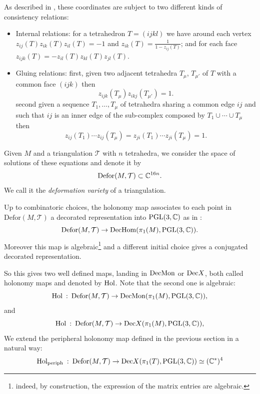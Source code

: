  As described in \cite{BFG}, these coordinates are subject to two different kinds of consistency relations: 
\begin{itemize}
 \item Internal relations: for a tetrahedron $T=(ijkl)$ we have around each vertex $z_{ij}(T)z_{ik}(T)z_{il}(T)=-1$ and $z_{ik}(T)=\frac{1}{1-z_{ij}(T)}$; and for each face $z_{ijk}(T)=-z_{il}(T)z_{kl}(T)z_{jl}(T)$.  
 \item Gluing relations: first, given two adjacent tetrahedra $T_{\mu}$, $T_{\mu'}$
of $T$ with a common face  
$(ijk)$ then 
\begin{equation} \label{face}
z_{ijk} (T_{\mu}) z_{ikj} (T_{\mu'}) = 1.
\end{equation}
second given a sequence $T_1, \ldots , T_{\mu}$ of tetrahedra sharing a
common edge $ij$ and such that $ij$ is an inner edge of the sub-complex composed by $T_1\cup \cdots \cup T_{\mu}$ 
then 
\begin{equation} \label{edge}
z_{ij} (T_1) \cdots z_{ij} (T_{\mu}) = z_{ji} (T_1) \cdots z_{ji} (T_{\mu}) = 1.
\end{equation}
 \end{itemize}
 
Given $M$ and a triangulation $\mathcal{T}$ with $n$ tetrahedra, we consider the space of solutions of these equations and denote it by 
$$
\mathrm{Defor}(M,\mathcal{T})\subset \mathbb{C}^{16n}.
$$
We call it the {\it deformation variety} of a triangulation. 

Up to combinatoric choices, the holonomy map associates to each point in $\mathrm{Defor}(M,\mathcal T)$ a decorated representation into $\textrm{PGL}(3,\mathbb{C})$ as in \cite[section 5]{BFG}: 
$$
\mathrm{Defor}(M,\mathcal{T})\rightarrow \mathrm{DecHom}(\pi_1(M),\textrm{PGL}(3,\mathbb{C})).
$$
Moreover this map is algebraic\footnote{indeed, by construction, the expression of the matrix entries are algebraic.} and a different initial choice gives a conjugated decorated representation.  

So this gives two well defined maps, landing in $\mathrm{DecMon}$ or $\mathrm{Dec}X$, both called holonomy maps and denoted by $\mathrm{Hol}$. Note that the second one is algebraic: 
$$
\mathrm{Hol}\: : \:\mathrm{Defor}(M,\mathcal{T})\rightarrow \mathrm{DecMon}(\pi_1(M),\textrm{PGL}(3,\mathbb{C})),
$$
and
$$
\mathrm{Hol}\: : \:\mathrm{Defor}(M,\mathcal{T})\rightarrow \mathrm{Dec}X(\pi_1(M),\textrm{PGL}(3,\mathbb{C})),
$$
We extend the peripheral holonomy map defined in the previous section in a natural way:
\[
\mathrm{Hol}_{\mathrm{periph}}\: : \:\mathrm{Defor}(M,\mathcal{T})\rightarrow\mathrm{Dec}X(\pi_1(T),\textrm{PGL}(3,\mathbb{C}))\simeq(\mathbb{C}^*)^4
\]


